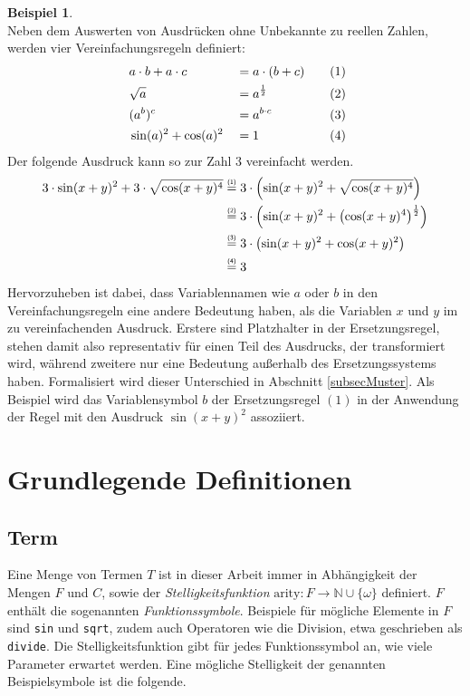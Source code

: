 \documentclass{scrartcl}
\numberwithin{figure}{section} %
\DeclarePairedDelimiter\paren{(}{)}
\theoremstyle{definition} %
\newcommand{\stapel}[2]{\mathrel{\overset{\makebox[0pt]{\mbox{\normalfont\tiny\sffamily {#2}}}}{#1}}}
\begin{document}
\newtheorem{bsp}{Beispiel}[section]
\begin{bsp}~\\
Neben dem Auswerten von Ausdrücken ohne Unbekannte zu reellen Zahlen, werden vier Vereinfachungsregeln definiert:
\begin{alignat*}{4}
    ~& a \cdot b + a \cdot c & &= a \cdot (b + c) &~~~& (1) \\
    ~& \sqrt{a}              & &= a^{\frac 1 2}   &~~~& (2) \\
    ~& \paren{a^b}^c         & &= a^{b \cdot c}   &~~~& (3) \\
    ~& \sin(a)^2 + \cos(a)^2 & &= 1               &~~~& (4)
\end{alignat*}
Der folgende Ausdruck kann so zur Zahl $3$ vereinfacht werden.
\begin{equation*}
    \begin{split}
	3 \cdot \sin(x + y)^2 + 3 \cdot \sqrt{\cos(x + y)^4} 
	&\stapel = {(1)} 3 \cdot \paren*{\sin(x + y)^2 + \sqrt{\cos(x + y)^4}} \\
	&\stapel = {(2)} 3 \cdot \paren*{\sin(x + y)^2 + \paren*{{\cos(x + y)^4}}^{\frac 1 2}}\\
	&\stapel = {(3)} 3 \cdot \paren*{\sin(x + y)^2 + {\cos(x + y)^2}}\\
	&\stapel = {(4)} 3
    \end{split}
\end{equation*}
Hervorzuheben ist dabei, dass Variablennamen wie $a$ oder $b$ in den Vereinfachungsregeln eine andere Bedeutung haben, als die Variablen $x$ und $y$ im zu vereinfachenden Ausdruck. Erstere sind Platzhalter in der Ersetzungsregel, stehen damit also representativ für einen Teil des Ausdrucks, der transformiert wird, während zweitere nur eine Bedeutung außerhalb des Ersetzungssystems haben. Formalisiert wird dieser Unterschied in Abschnitt \ref{subsecMuster}. Als Beispiel wird das Variablensymbol $b$ der Ersetzungsregel $(1)$ in der Anwendung der Regel mit den Ausdruck $\sin(x + y)^2$ assoziiert. 
\end{bsp}

\section{Grundlegende Definitionen} \label{secGrundlegendeDefinitionen}

\subsection{Term}
Eine Menge von Termen $T$ ist in dieser Arbeit immer  in Abhängigkeit der Mengen $F$ und $C$, sowie der \emph{Stelligkeitsfunktion} $\mathrm{arity} \colon F \rightarrow \mathbb{N} \cup \{\omega\}$ definiert. $F$ enthält die sogenannten \emph{Funktionssymbole}. Beispiele für mögliche Elemente in $F$ sind \texttt{sin} und \texttt{sqrt}, zudem auch Operatoren wie die Division, etwa geschrieben als \texttt{divide}. Die Stelligkeitsfunktion gibt für jedes Funktionssymbol an, wie viele Parameter erwartet werden. Eine mögliche Stelligkeit der genannten Beispielsymbole ist die folgende.
\end{document}
